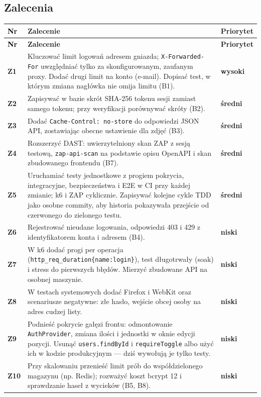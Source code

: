 \documentclass[a4paper,11pt]{article}
\newcommand{\code}[1]{\texttt{\small #1}}
\newcommand{\sev}[1]{\textsf{\small\bfseries #1}}
\newcommand{\wysoki}{\textcolor{bad}{\sev{wysoki}}}
\newcommand{\sredni}{\textcolor{warn}{\sev{średni}}}
\newcommand{\niski}{\textcolor{accent}{\sev{niski}}}
\begin{document}
\subsection{Zalecenia}
\begin{xltabular}{\textwidth}{@{}>{\sffamily\bfseries\color{accent}}l L l@{}}
\toprule
\textcolor{black}{Nr} & \textsf{\textbf{Zalecenie}} & \textsf{\textbf{Priorytet}}\\
\midrule
\endfirsthead
\toprule
\textcolor{black}{Nr} & \textsf{\textbf{Zalecenie}} & \textsf{\textbf{Priorytet}}\\
\midrule
\endhead
\bottomrule
\endfoot
Z1 & Kluczować limit logowań adresem gniazda; \code{X-Forwarded-For} uwzględniać tylko za
     skonfigurowanym, zaufanym proxy. Dodać drugi limit na konto (e-mail). Dopisać test,
     w którym zmiana nagłówka nie omija limitu (B1). & \wysoki\\
Z2 & Zapisywać w bazie skrót SHA-256 tokenu sesji zamiast samego tokenu; przy weryfikacji
     porównywać skróty (B2). & \sredni\\
Z3 & Dodać \code{Cache-Control: no-store} do odpowiedzi JSON API, zostawiając obecne
     ustawienie dla zdjęć (B3). & \sredni\\
Z4 & Rozszerzyć DAST: uwierzytelniony skan ZAP z sesją testową, \code{zap-api-scan} na
     podstawie opisu OpenAPI i skan zbudowanego frontendu (B7). & \sredni\\
Z5 & Uruchamiać testy jednostkowe z progiem pokrycia, integracyjne, bezpieczeństwa i E2E
     w CI przy każdej zmianie; k6 i ZAP cyklicznie. Zapisywać kolejne cykle TDD jako osobne
     commity, aby historia pokazywała przejście od czerwonego do zielonego testu. & \sredni\\
Z6 & Rejestrować nieudane logowania, odpowiedzi 403 i 429 z identyfikatorem konta
     i adresem (B4). & \niski\\
Z7 & W k6 dodać progi per operacja (\code{http\_req\_duration\{name:login\}}),
     test długotrwały (soak) i stress do pierwszych błędów. Mierzyć zbudowane API
     na osobnej maszynie. & \niski\\
Z8 & W testach systemowych dodać Firefox i WebKit oraz scenariusze negatywne: złe hasło,
     wejście obcej osoby na adres cudzej listy. & \niski\\
Z9 & Podnieść pokrycie gałęzi frontu: odmontowanie \code{AuthProvider}, zmiana ilości
     i jednostki w oknie edycji pozycji. Usunąć \code{users.findById} i \code{requireToggle}
     albo użyć ich w kodzie produkcyjnym — dziś wywołują je tylko testy. & \niski\\
Z10 & Przy skalowaniu przenieść limit prób do współdzielonego magazynu (np. Redis);
      rozważyć koszt bcrypt 12 i sprawdzanie haseł z wycieków (B5, B8). & \niski\\
\end{xltabular}
\end{document}
